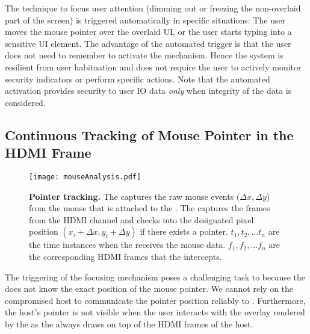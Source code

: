 
\parasave
{} The technique to focus user attention (dimming out or freezing the non-overlaid part of the screen) is triggered automatically in specific situations: The user moves the mouse pointer over the overlaid UI, or the user starts typing into a sensitive UI element. 
The advantage of the automated trigger is that the user does not need to remember to activate the mechanism. Hence the system is resilient from user habituation and does not require the user to actively monitor security indicators or perform specific actions. Note that the automated activation provides security to user IO data \emph{only} when integrity of the data is considered.

\subsection{Continuous Tracking of Mouse Pointer in the HDMI Frame}
\label{sec:systemDesign:analysis}


\begin{figure}[t]
\centering
\texttt{[image: mouseAnalysis.pdf]}
\caption{\textbf{Pointer tracking.} \one The \device captures the raw mouse events ($\Delta x, \Delta y$) from the mouse that is attached to the \device. \two The \device captures the frames from the HDMI channel and checks into the designated pixel position $(x_i + \Delta x, y_i + \Delta y)$ if there exists a pointer. $t_1, t_2,\ldots t_n$ are the time instances when the \device receives the mouse data. $f_1, f_2,\ldots f_n$ are the corresponding HDMI frames that the \device intercepts.}
\spacesave
\label{fig:mouseAnalysis}
\centering
\end{figure}


The triggering of the focusing mechanism poses a challenging task to \name because the \device does not know the exact position of the mouse pointer. We cannot rely on the compromised host to communicate the pointer position reliably to \device. Furthermore, the host's pointer is not visible when the user interacts with the overlay rendered by the \device as the \device always draws on top of the HDMI frames of the host. 

